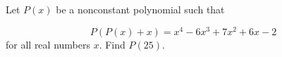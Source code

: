 Let \(P(x)\) be a nonconstant polynomial such that

\[
P(P(x)+x)=x^4-6x^3+7x^2+6x-2
\]for all real numbers \(x\). Find \(P(25)\).

